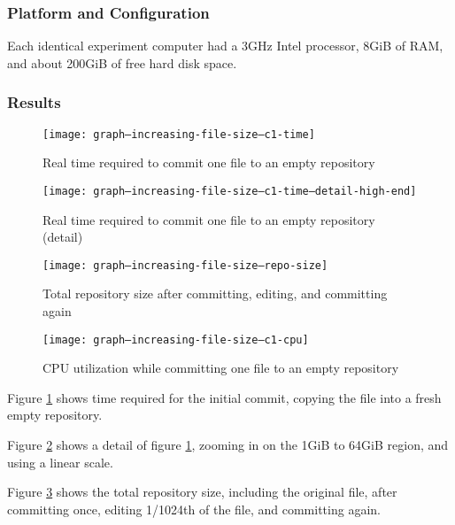 \documentclass[a4paper]{article}
\begin{document}
\subsubsection{Platform and Configuration}

Each identical experiment computer had a 3GHz Intel processor, 8GiB of RAM, and
about 200GiB of free hard disk space.

\subsubsection{Results}

\begin{figure}[p]
  \caption{Real time required to commit one file to an empty repository}
  \label{fig:graph--increasing-file-size--c1-time}
  \centering
    \texttt{[image: graph--increasing-file-size--c1-time]}
\end{figure}

\begin{figure}[p]
  \caption{Real time required to commit one file to an empty repository (detail)}
  \label{fig:graph--increasing-file-size--c1-time--detail-high-end}
  \centering
    \texttt{[image: graph--increasing-file-size--c1-time--detail-high-end]}
\end{figure}

\begin{figure}[p]
  \caption{Total repository size after committing, editing, and committing again}
  \label{fig:graph--increasing-file-size--repo-size}
  \centering
    \texttt{[image: graph--increasing-file-size--repo-size]}
\end{figure}

\begin{figure}[p]
  \caption{CPU utilization while committing one file to an empty repository}
  \label{fig:graph--increasing-file-size--c1-cpu}
  \centering
    \texttt{[image: graph--increasing-file-size--c1-cpu]}
\end{figure}

Figure \ref{fig:graph--increasing-file-size--c1-time} shows time required for
the initial commit, copying the file into a fresh empty repository.

Figure \ref{fig:graph--increasing-file-size--c1-time--detail-high-end} shows a
detail of figure \ref{fig:graph--increasing-file-size--c1-time}, zooming in on
the 1GiB to 64GiB region, and using a linear scale.

Figure \ref{fig:graph--increasing-file-size--repo-size} shows the total
repository size, including the original file, after committing once, editing
1/1024th of the file, and committing again.
\end{document}
